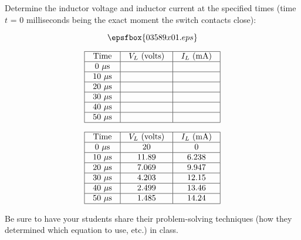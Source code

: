 

Determine the inductor voltage and inductor current at the specified times (time $t$ = 0 milliseconds being the exact moment the switch contacts close):

$$\epsfbox{03589x01.eps}$$


$$\vbox{\offinterlineskip
\halign{\strut
\vrule \quad\hfil # \ \hfil & 
\vrule \quad\hfil # \ \hfil & 
\vrule \quad\hfil # \ \hfil \vrule \cr
\noalign{\hrule}
%
Time & $V_L$ (volts) & $I_L$ (mA) \cr
%
\noalign{\hrule}
%
0 $\mu$s &  &  \cr
%
\noalign{\hrule}
%
10 $\mu$s &  &  \cr
%
\noalign{\hrule}
%
20 $\mu$s &  &  \cr
%
\noalign{\hrule}
%
30 $\mu$s &  &  \cr
%
\noalign{\hrule}
%
40 $\mu$s &  &  \cr
%
\noalign{\hrule}
%
50 $\mu$s &  &  \cr
%
\noalign{\hrule}
} %
}$$ %








$$\vbox{\offinterlineskip
\halign{\strut
\vrule \quad\hfil # \ \hfil & 
\vrule \quad\hfil # \ \hfil & 
\vrule \quad\hfil # \ \hfil \vrule \cr
\noalign{\hrule}
%
Time & $V_L$ (volts) & $I_L$ (mA) \cr
%
\noalign{\hrule}
%
0 $\mu$s & 20 & 0 \cr
%
\noalign{\hrule}
%
10 $\mu$s & 11.89 & 6.238 \cr
%
\noalign{\hrule}
%
20 $\mu$s & 7.069 & 9.947 \cr
%
\noalign{\hrule}
%
30 $\mu$s & 4.203 & 12.15 \cr
%
\noalign{\hrule}
%
40 $\mu$s & 2.499 & 13.46 \cr
%
\noalign{\hrule}
%
50 $\mu$s & 1.485 & 14.24 \cr
%
\noalign{\hrule}
} %
}$$ %







Be sure to have your students share their problem-solving techniques (how they determined which equation to use, etc.) in class.




